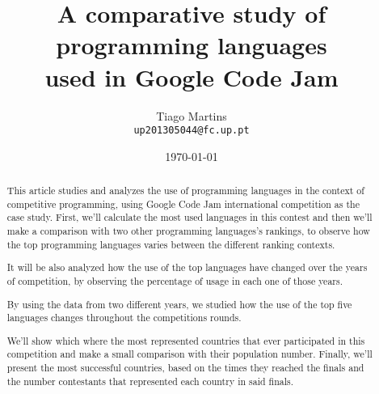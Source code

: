 \documentclass{article}
\begin{document}
\title{A comparative study of programming languages\\used in Google Code Jam}

\author{Tiago Martins\\ \texttt{up201305044@fc.up.pt} \\
}

\date{\today}

\maketitle


\begin{abstract}

This article studies and analyzes the use of programming languages in the context of competitive programming, using Google Code Jam international competition as the case study. First, we'll calculate the most used languages in this contest and then we'll make a comparison with two other programming languages's rankings, to observe how the top programming languages varies between the different ranking contexts.

It will be also analyzed how the use of the top languages have changed over the years of competition, by observing the percentage of usage in each one of those years.

By using the data from two different years, we studied how the use of the top five languages changes throughout the competitions rounds.

We'll show which where the most represented countries that ever participated in this competition and make a small comparison with their population number. Finally, we'll present the most successful countries, based on the times they reached the finals and the number contestants that represented each country in said finals.

\end{abstract}

\end{document}
